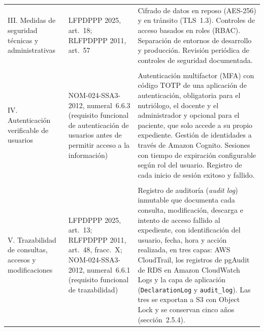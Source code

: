 \documentclass[12pt, a4paper]{article}
\begin{document}
\begin{longtable}{>{\raggedright\arraybackslash}p{2.8cm}
  >{\raggedright\arraybackslash}p{3.0cm}
  >{\raggedright\arraybackslash}p{8.5cm}}
  III. Medidas de seguridad técnicas y administrativas
    & LFPDPPP 2025, art.~18; RLFPDPPP 2011, art.~57
    & Cifrado de datos en reposo (AES-256) y en tránsito
      (TLS~1.3). Controles de acceso basados
      en roles (RBAC). Separación de entornos de desarrollo
      y producción. Revisión periódica de controles de
      seguridad documentada. \\
  \\[4pt]

  IV. Autenticación verificable de usuarios
    & NOM-024-SSA3-2012, numeral~6.6.3 (requisito funcional de autenticación
      de usuarios antes de permitir acceso a la información)
    & Autenticación multifactor (MFA) con código TOTP de una
      aplicación de autenticación, obligatoria para el nutriólogo, el
      docente y el administrador y opcional para el paciente, que solo
      accede a su propio expediente. Gestión de identidades a través de Amazon
      Cognito. Sesiones con tiempo de expiración configurable
      según rol del usuario. Registro de cada inicio de sesión
      exitoso y fallido. \\
  \\[4pt]

  V. Trazabilidad de consultas, accesos y modificaciones
    & LFPDPPP 2025, art.~13; RLFPDPPP 2011, art.~48, fracc.~X; NOM-024-SSA3-2012, numeral~6.6.1 (requisito funcional de trazabilidad)
    & Registro de auditoría (\textit{audit log}) inmutable que documenta
      cada consulta, modificación, descarga e intento de acceso
      fallido al expediente, con identificación del usuario,
      fecha, hora y acción realizada, en tres capas: AWS
       CloudTrail, los registros de pgAudit de RDS en Amazon CloudWatch Logs y la
      capa de aplicación (\texttt{DeclarationLog} y \texttt{audit\_log}). Las tres se
      exportan a S3 con Object Lock y se conservan cinco años
      (sección~2.5.4). \\

\end{longtable}
\end{document}
